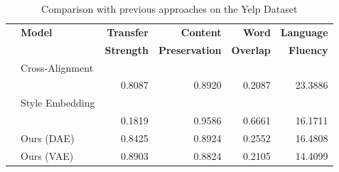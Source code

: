 \begin{table}[ht]
	\centering
	\begin{tabular}{| c | l | r | r | r | r |}
		\hline
		\multirow{2}{*}{} & \textbf{Model}        & \textbf{Transfer} & \textbf{Content}      & \textbf{Word}    & \textbf{Language} \\
		                  &                       & \textbf{Strength} & \textbf{Preservation} & \textbf{Overlap} & \textbf{Fluency}  \\
		\hline
		\hline
		\multirow{2}{*}{} & Cross-Alignment       &                   &                       &                  &                   \\
		                  & \citep{shen2017style} & 0.8087            & 0.8920                & 0.2087           & 23.3886           \\
		\hline
		\multirow{2}{*}{} & Style Embedding       &                   &                       &                  &                   \\
		                  & \citep{fu2017style}   & 0.1819            & 0.9586                & 0.6661           & 16.1711           \\
		\hline
		                  & Ours (DAE)            & 0.8425            & 0.8924                & 0.2552           & 16.4808           \\
		\hline
		                  & Ours (VAE)            & 0.8903            & 0.8824                & 0.2105           & 14.4099           \\
		\hline
	\end{tabular}
	\caption{Comparison with previous approaches on the Yelp Dataset}
	\label{tab:comparison-previous}
\end{table}

